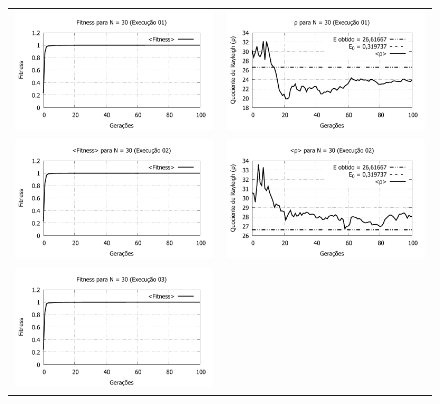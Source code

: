 \begin{figure}[htbp]
\centering
  \begin{tabular}{@{}cc@{}}
    \includegraphics[width=.45\textwidth]{figs/resultados/fitnessGrad/N30_01_fitness.pdf} &
    \includegraphics[width=.45\textwidth]{figs/resultados/fitnessGrad/N30_01_rho.pdf}   \\
		\includegraphics[width=.45\textwidth]{figs/resultados/fitnessGrad/N30_02_fitness.pdf} &
    \includegraphics[width=.45\textwidth]{figs/resultados/fitnessGrad/N30_02_rho.pdf}   \\
		\includegraphics[width=.45\textwidth]{figs/resultados/fitnessGrad/N30_03_fitness.pdf} &

\end{tabular}
\end{figure}
